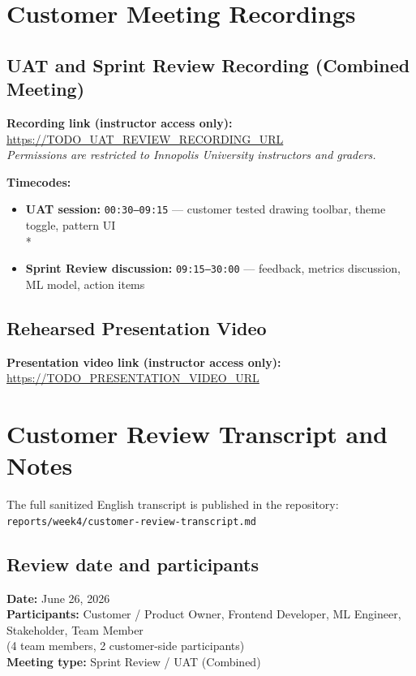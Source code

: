 \documentclass[11pt,a4paper]{article}
\begin{document}
\section{Customer Meeting Recordings}

\subsection{UAT and Sprint Review Recording (Combined Meeting)}

\textbf{Recording link (instructor access only):} \\
\url{https://TODO_UAT_REVIEW_RECORDING_URL} \\
\textit{Permissions are restricted to Innopolis University instructors and graders.}

\textbf{Timecodes:}
\begin{itemize}
    \item \textbf{UAT session:} \texttt{00:30--09:15} --- customer tested drawing toolbar, theme toggle, pattern UI \\*
    \item \textbf{Sprint Review discussion:} \texttt{09:15--30:00} --- feedback, metrics discussion, ML model, action items
\end{itemize}

\subsection{Rehearsed Presentation Video}

\textbf{Presentation video link (instructor access only):} \\
\url{https://TODO_PRESENTATION_VIDEO_URL}

\section{Customer Review Transcript and Notes}

The full sanitized English transcript is published in the repository:
\texttt{reports/week4/customer-review-transcript.md}

\subsection{Review date and participants}
\textbf{Date:} June 26, 2026 \\
\textbf{Participants:} Customer / Product Owner, Frontend Developer, ML Engineer, Stakeholder, Team Member \\
(4 team members, 2 customer-side participants) \\
\textbf{Meeting type:} Sprint Review / UAT (Combined)
\end{document}
